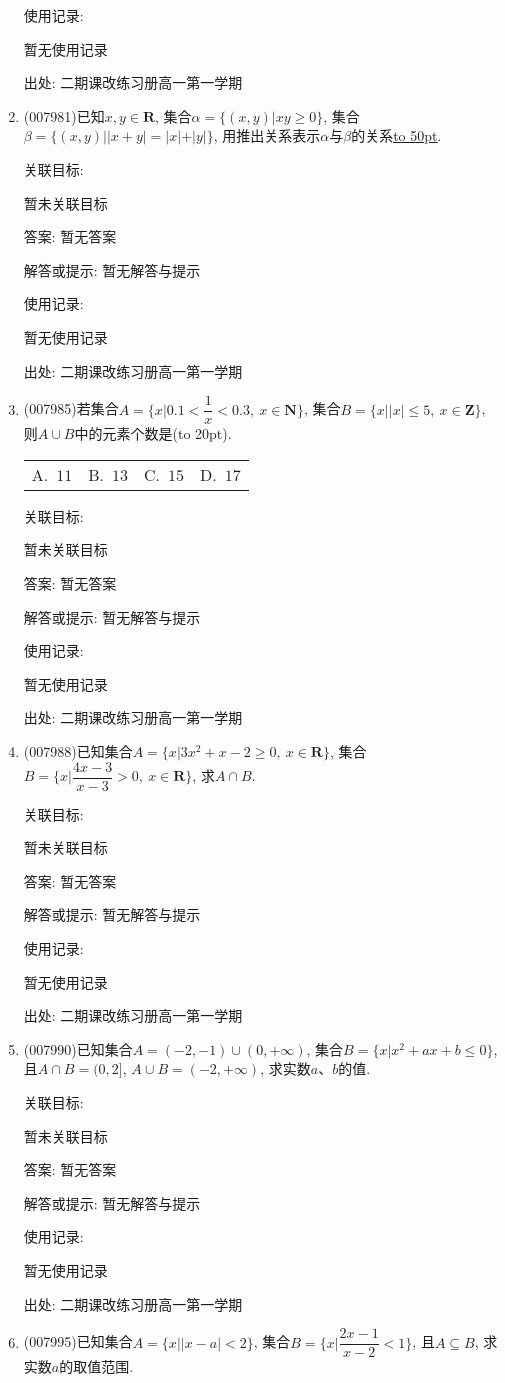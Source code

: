 \documentclass[10pt,a4paper]{article}
\newcommand{\blank}[1]{\underline{\hbox to #1pt{}}}
\newcommand{\bracket}[1]{(\hbox to #1pt{})}
\newcommand{\fourch}[4]{\par\begin{tabular}{p{.23\textwidth}p{.23\textwidth}p{.23\textwidth}p{.23\textwidth}}
A.~#1 &B.~#2& C.~#3& D.~#4
\end{tabular}}
\begin{document}
\begin{enumerate}[1.]
使用记录:

暂无使用记录


出处: 二期课改练习册高一第一学期
\item { (007981)}已知$x,y\in \mathbf{R}$, 集合$\alpha =\{(x,y)|xy\ge 0\}$, 集合$\beta =\{(x,y)||x+y|=|x|+|y|\}$, 用推出关系表示$\alpha$与$\beta$的关系\blank{50}.


关联目标:

暂未关联目标

答案: 暂无答案

解答或提示: 暂无解答与提示

使用记录:

暂无使用记录


出处: 二期课改练习册高一第一学期
\item { (007985)}若集合$A=\{x|0.1<\dfrac 1x<0.3,\ x\in \mathbf{N}\}$, 集合$B=\{x||x|\le 5,\ x\in \mathbf{Z}\}$, 则$A\cup B$中的元素个数是\bracket{20}.
\fourch{$11$}{$13$}{$15$}{$17$}


关联目标:

暂未关联目标

答案: 暂无答案

解答或提示: 暂无解答与提示

使用记录:

暂无使用记录


出处: 二期课改练习册高一第一学期
\item { (007988)}已知集合$A=\{x|3x^2+x-2\ge 0,\  x\in \mathbf{R}\}$, 集合$B=\{x|\dfrac{4x-3}{x-3}>0,\ x\in \mathbf{R}\}$, 求$A\cap B$.


关联目标:

暂未关联目标

答案: 暂无答案

解答或提示: 暂无解答与提示

使用记录:

暂无使用记录


出处: 二期课改练习册高一第一学期
\item { (007990)}已知集合$A=(-2,-1)\cup (0,+\infty)$, 集合$B=\{x|x^2+ax+b\le 0\}$, 且$A\cap B=(0,2]$, $A\cup B=(-2,+\infty)$, 求实数$a$、$b$的值.


关联目标:

暂未关联目标

答案: 暂无答案

解答或提示: 暂无解答与提示

使用记录:

暂无使用记录


出处: 二期课改练习册高一第一学期
\item { (007995)}已知集合$A=\{x||x-a|<2\}$, 集合$B=\{x|\dfrac{2x-1}{x-2}<1\}$, 且$A\subseteq B$, 求实数$a$的取值范围.



\end{enumerate}
\end{document}
